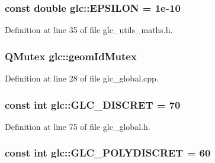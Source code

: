 \hypertarget{namespaceglc_aae6f7586977fa188ed9f7bfd019ee5fc}{
\subsubsection[{E\-P\-S\-I\-L\-O\-N}]{\setlength{\rightskip}{0pt plus 5cm}const {\bf double} glc\-::\-E\-P\-S\-I\-L\-O\-N = 1e-\/10}}\label{namespaceglc_aae6f7586977fa188ed9f7bfd019ee5fc}


Definition at line 35 of file glc\-\_\-utils\-\_\-maths.\-h.

\hypertarget{namespaceglc_a9176591e1e73cf86595e70df3265faa0}{
\subsubsection[{geom\-Id\-Mutex}]{\setlength{\rightskip}{0pt plus 5cm}Q\-Mutex glc\-::geom\-Id\-Mutex}}\label{namespaceglc_a9176591e1e73cf86595e70df3265faa0}


Definition at line 28 of file glc\-\_\-global.\-cpp.

\hypertarget{namespaceglc_acefef2777b4762200bba27e60924ed43}{
\subsubsection[{G\-L\-C\-\_\-\-D\-I\-S\-C\-R\-E\-T}]{\setlength{\rightskip}{0pt plus 5cm}const {\bf int} glc\-::\-G\-L\-C\-\_\-\-D\-I\-S\-C\-R\-E\-T = 70}}\label{namespaceglc_acefef2777b4762200bba27e60924ed43}


Definition at line 75 of file glc\-\_\-global.\-h.

\hypertarget{namespaceglc_a5ada6dbdc4f76b79195f64214ca91be5}{
\subsubsection[{G\-L\-C\-\_\-\-P\-O\-L\-Y\-D\-I\-S\-C\-R\-E\-T}]{\setlength{\rightskip}{0pt plus 5cm}const {\bf int} glc\-::\-G\-L\-C\-\_\-\-P\-O\-L\-Y\-D\-I\-S\-C\-R\-E\-T = 60}}\label{namespaceglc_a5ada6dbdc4f76b79195f64214ca91be5}


